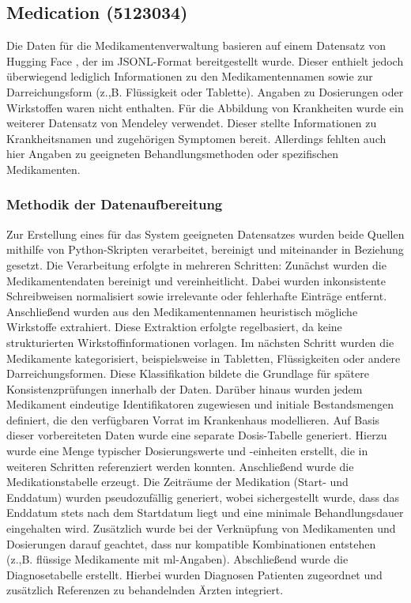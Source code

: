 \subsection{Medication (5123034)}
Die Daten für die Medikamentenverwaltung basieren auf einem Datensatz von Hugging Face \cite{HuggingFace_Dataset} , der im JSONL-Format bereitgestellt wurde. Dieser enthielt jedoch überwiegend lediglich Informationen zu den Medikamentennamen sowie zur Darreichungsform (z.,B. Flüssigkeit oder Tablette). Angaben zu Dosierungen oder Wirkstoffen waren nicht enthalten.
Für die Abbildung von Krankheiten wurde ein weiterer Datensatz von Mendeley \cite{Mendeley_Dataset} verwendet. Dieser stellte Informationen zu Krankheitsnamen und zugehörigen Symptomen bereit. Allerdings fehlten auch hier Angaben zu geeigneten Behandlungsmethoden oder spezifischen Medikamenten.
\subsubsection{Methodik der Datenaufbereitung}
Zur Erstellung eines für das System geeigneten Datensatzes wurden beide Quellen mithilfe von Python-Skripten verarbeitet, bereinigt und miteinander in Beziehung gesetzt. Die Verarbeitung erfolgte in mehreren Schritten:
Zunächst wurden die Medikamentendaten bereinigt und vereinheitlicht. Dabei wurden inkonsistente Schreibweisen normalisiert sowie irrelevante oder fehlerhafte Einträge entfernt. Anschließend wurden aus den Medikamentennamen heuristisch mögliche Wirkstoffe extrahiert. Diese Extraktion erfolgte regelbasiert, da keine strukturierten Wirkstoffinformationen vorlagen.
Im nächsten Schritt wurden die Medikamente kategorisiert, beispielsweise in Tabletten, Flüssigkeiten oder andere Darreichungsformen. Diese Klassifikation bildete die Grundlage für spätere Konsistenzprüfungen innerhalb der Daten.
Darüber hinaus wurden jedem Medikament eindeutige Identifikatoren zugewiesen und initiale Bestandsmengen definiert, die den verfügbaren Vorrat im Krankenhaus modellieren.
Auf Basis dieser vorbereiteten Daten wurde eine separate Dosis-Tabelle generiert. Hierzu wurde eine Menge typischer Dosierungswerte und -einheiten erstellt, die in weiteren Schritten referenziert werden konnten.
Anschließend wurde die Medikationstabelle erzeugt. Die Zeiträume der Medikation (Start- und Enddatum) wurden pseudozufällig generiert, wobei sichergestellt wurde, dass das Enddatum stets nach dem Startdatum liegt und eine minimale Behandlungsdauer eingehalten wird. Zusätzlich wurde bei der Verknüpfung von Medikamenten und Dosierungen darauf geachtet, dass nur kompatible Kombinationen entstehen (z.,B. flüssige Medikamente mit ml-Angaben).
Abschließend wurde die Diagnosetabelle erstellt. Hierbei wurden Diagnosen Patienten zugeordnet und zusätzlich Referenzen zu behandelnden Ärzten integriert.
